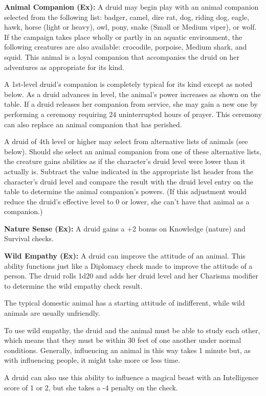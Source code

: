 \documentclass{article}
\begin{document}
\textbf{Animal Companion (Ex):} A druid may begin play with an animal companion 
selected from the following list: badger, camel, dire rat, dog, riding dog, eagle, 
hawk, horse (light or heavy), owl, pony, snake (Small or Medium viper), or wolf. 
If the campaign takes place wholly or partly in an aquatic environment, the following 
creatures are also available: crocodile, porpoise, Medium shark, and squid. This 
animal is a loyal companion that accompanies the druid on her adventures as appropriate 
for its kind.

A 1st-level druid's companion is completely typical for its kind except as noted 
below. As a druid advances in level, the animal's power increases as shown on the 
table. If a druid releases her companion from service, she may gain a new one by 
performing a ceremony requiring 24 uninterrupted hours of prayer. This ceremony 
can also replace an animal companion that has perished.

A druid of 4th level or higher may select from alternative lists of animals (see 
below). Should she select an animal companion from one of these alternative lists, 
the creature gains abilities as if the character's druid level were lower than 
it actually is. Subtract the value indicated in the appropriate list header from 
the character's druid level and compare the result with the druid level entry on 
the table to determine the animal companion's powers. (If this adjustment would 
reduce the druid's effective level to 0 or lower, she can't have that animal as 
a companion.) 

\textbf{Nature Sense (Ex):} A druid gains a +2 bonus on Knowledge (nature) and 
Survival checks.

\textbf{Wild Empathy (Ex):} A druid can improve the attitude of an animal. This 
ability functions just like a Diplomacy check made to improve the attitude of a 
person. The druid rolls 1d20 and adds her druid level and her Charisma modifier 
to determine the wild empathy check result.

The typical domestic animal has a starting attitude of indifferent, while wild 
animals are usually unfriendly.

To use wild empathy, the druid and the animal must be able to study each other, 
which means that they must be within 30 feet of one another under normal conditions. 
Generally, influencing an animal in this way takes 1 minute but, as with influencing 
people, it might take more or less time.

A druid can also use this ability to influence a magical beast with an Intelligence 
score of 1 or 2, but she takes a -4 penalty on the check.
\end{document}
